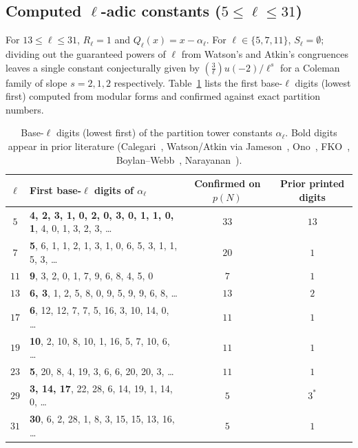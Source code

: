 \documentclass[11pt,reqno]{amsart}
\theoremstyle{definition}
\theoremstyle{remark}
\newcommand{\legendre}[2]{\left(\frac{#1}{#2}\right)}
\begin{document}
\subsection{Computed $\ell$-adic constants ($5 \le \ell \le 31$)}
For $13 \le \ell \le 31$, $R_\ell = 1$ and $Q_\ell(x) = x - \alpha_\ell$. For $\ell \in \{5, 7, 11\}$, $S_\ell = \emptyset$; dividing out the guaranteed powers of $\ell$ from Watson's and Atkin's congruences leaves a single constant conjecturally given by $\legendre{3}{\ell} u(-2)/\ell^s$ for a Coleman family of slope $s = 2, 1, 2$ respectively. Table~\ref{tab:constants} lists the first base-$\ell$ digits (lowest first) computed from modular forms and confirmed against exact partition numbers.

\begin{table}[h]
\centering
\caption{Base-$\ell$ digits (lowest first) of the partition tower constants $\alpha_\ell$. Bold digits appear in prior literature (Calegari~\cite{Cal13}, Watson/Atkin via Jameson~\cite{Jam}, Ono~\cite{Ono00}, FKO~\cite{FKO}, Boylan--Webb~\cite{BW}, Narayanan~\cite{Nar19}).}
\label{tab:constants}
\small
\begin{tabular}{@{}clcc@{}}
\toprule
$\ell$ & First base-$\ell$ digits of $\alpha_\ell$ & Confirmed on $p(N)$ & Prior printed digits \\
\midrule
$5$  & \textbf{4, 2, 3, 1, 0, 2, 0, 3, 0, 1, 1, 0, 1}, 4, 0, 1, 3, 2, 3, \dots & $33$ & $13$ \cite{Cal13} \\
$7$  & \textbf{5}, 6, 1, 1, 2, 1, 3, 1, 0, 6, 5, 3, 1, 1, 5, 3, \dots & $20$ & $1$ \cite{Jam} \\
$11$ & \textbf{9}, 3, 2, 0, 1, 7, 9, 6, 8, 4, 5, 0 & $7$ & $1$ \cite{Jam} \\
$13$ & \textbf{6, 3}, 1, 2, 5, 8, 0, 9, 5, 9, 9, 6, 8, \dots & $13$ & $2$ \cite{Ono00,FKO} \\
$17$ & \textbf{6}, 12, 12, 7, 7, 5, 16, 3, 10, 14, 0, \dots & $11$ & $1$ \cite{Ono00} \\
$19$ & \textbf{10}, 2, 10, 8, 10, 1, 16, 5, 7, 10, 6, \dots & $11$ & $1$ \cite{Ono00} \\
$23$ & \textbf{5}, 20, 8, 4, 19, 3, 6, 6, 20, 20, 3, \dots & $11$ & $1$ \cite{Ono00} \\
$29$ & \textbf{3, 14, 17}, 22, 28, 6, 14, 19, 1, 14, 0, \dots & $5$ & $3^*$ \cite{BW} \\
$31$ & \textbf{30}, 6, 2, 28, 1, 8, 3, 15, 15, 13, 16, \dots & $5$ & $1$ \cite{Nar19} \\
\bottomrule
\end{tabular}
\end{table}
\end{document}
